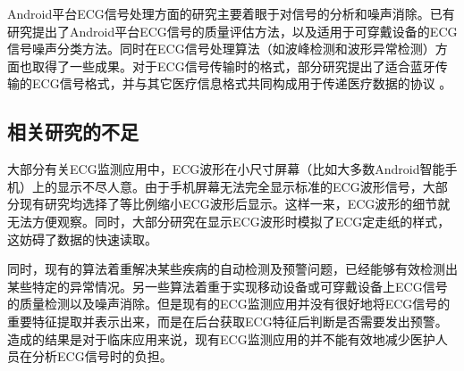 Android平台ECG信号处理方面的研究主要着眼于对信号的分析和噪声消除。已有研究提出了Android平台ECG信号的质量评估方法\cite{chudacek}，以及适用于可穿戴设备的ECG信号噪声分类方法\cite{classification}。同时在ECG信号处理算法（如波峰检测和波形异常检测）方面也取得了一些成果\cite{julien}。对于ECG信号传输时的格式，部分研究提出了适合蓝牙传输的ECG信号格式，并与其它医疗信息格式共同构成用于传递医疗数据的协议\cite{xiaojintang} \cite{dongdonglou}。

\subsection{相关研究的不足}

大部分有关ECG监测应用中，ECG波形在小尺寸屏幕（比如大多数Android智能手机）上的显示不尽人意。由于手机屏幕无法完全显示标准的ECG波形信号，大部分现有研究均选择了等比例缩小ECG波形后显示。这样一来，ECG波形的细节就无法方便观察。同时，大部分研究在显示ECG波形时模拟了ECG定走纸的样式，这妨碍了数据的快速读取。

同时，现有的算法着重解决某些疾病的自动检测及预警问题，已经能够有效检测出某些特定的异常情况。另一些算法着重于实现移动设备或可穿戴设备上ECG信号的质量检测以及噪声消除\cite{classification}。但是现有的ECG监测应用并没有很好地将ECG信号的重要特征提取并表示出来，而是在后台获取ECG特征后判断是否需要发出预警。造成的结果是对于临床应用来说，现有ECG监测应用的并不能有效地减少医护人员在分析ECG信号时的负担。


